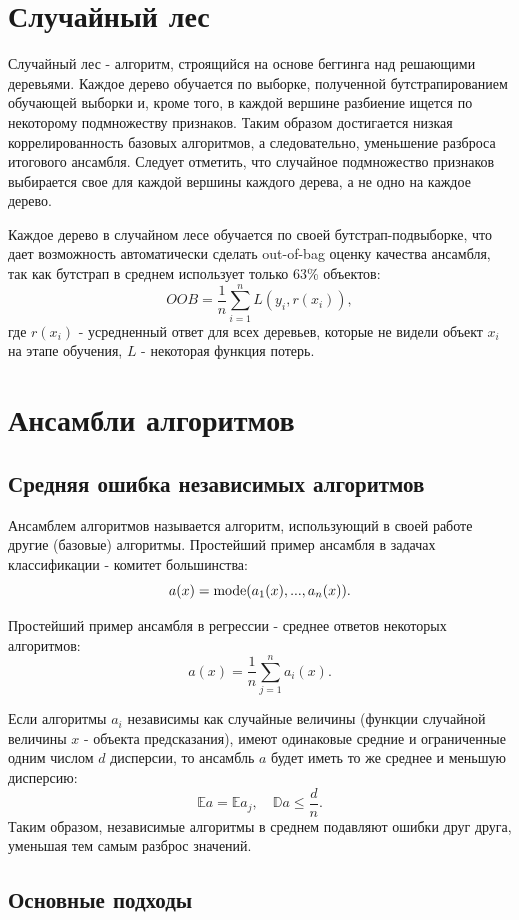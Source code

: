 \section{Случайный лес}

Случайный лес - алгоритм, строящийся на основе беггинга над решающими деревьями. Каждое дерево обучается по выборке, полученной бутстрапированием обучающей выборки и, кроме того, в каждой вершине разбиение ищется по некоторому подмножеству признаков. Таким образом достигается низкая коррелированность базовых алгоритмов, а следовательно, уменьшение разброса итогового ансамбля. Следует отметить, что случайное подмножество признаков выбирается свое для каждой вершины каждого дерева, а не одно на каждое дерево.

Каждое дерево в случайном лесе обучается по своей бутстрап-подвыборке, что дает возможность автоматически сделать out-of-bag оценку качества ансамбля, так как бутстрап в среднем использует только 63\% объектов:
$$
OOB = \frac{1}{n}\sum_{i=1}^nL(y_i, r(x_i)),
$$
где $r(x_i)$ - усредненный ответ для всех деревьев, которые не видели объект $x_i$ на этапе обучения, $L$ - некоторая функция потерь.


\section{Ансамбли алгоритмов}

\subsection{Средняя ошибка независимых алгоритмов}

Ансамблем алгоритмов называется алгоритм, использующий в своей работе другие (базовые) алгоритмы.
Простейший пример ансамбля в задачах классификации - комитет большинства:
$$
a(x) = \operatorname*{mode}(a_1(x), ..., a_n(x)).
$$

Простейший пример ансамбля в регрессии - среднее ответов некоторых алгоритмов:
$$
a(x) = \frac{1}{n}\sum_{j=1}^na_i(x).
$$

Если алгоритмы $a_i$ независимы как случайные величины (функции случайной величины $x$ - объекта предсказания), имеют одинаковые средние и ограниченные одним числом $d$ дисперсии, то ансамбль $a$ будет иметь то же среднее и меньшую дисперсию:
$$
\mathbb{E}a = \mathbb{E}a_j, \quad \mathbb{D}a \leqslant \frac{d}{n}.
$$
Таким образом, независимые алгоритмы в среднем подавляют ошибки друг друга, уменьшая тем самым разброс значений.


\subsection{Основные подходы}

